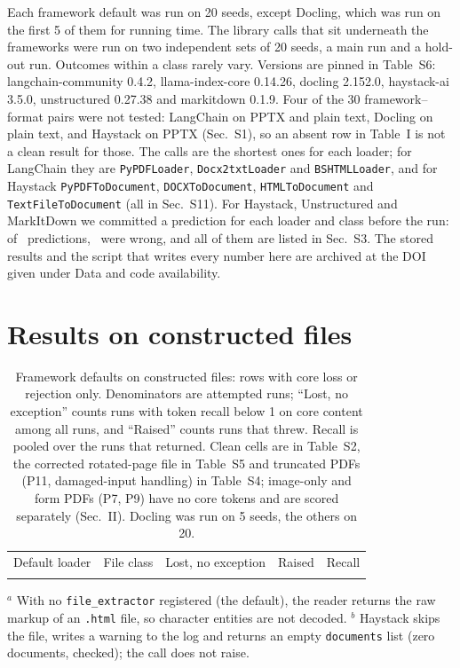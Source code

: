 \documentclass[aps,pre,twocolumn,superscriptaddress,nofootinbib,10pt]{revtex4-2}
\begin{document}
Each framework default was run on 20 seeds, except Docling, which was run on the first 5 of them for running time. The library calls that sit underneath the frameworks were run on two independent sets of 20 seeds, a main run and a hold-out run. Outcomes within a class rarely vary. Versions are pinned in Table~S6: langchain-community 0.4.2, llama-index-core 0.14.26, docling 2.152.0, haystack-ai 3.5.0, unstructured 0.27.38 and markitdown 0.1.9. Four of the 30 framework--format pairs were not tested: LangChain on PPTX and plain text, Docling on plain text, and Haystack on PPTX (Sec.~S1), so an absent row in Table~I is not a clean result for those. The calls are the shortest ones for each loader; for LangChain they are \texttt{PyPDFLoader}, \texttt{Docx2txtLoader} and \texttt{BSHTMLLoader}, and for Haystack \texttt{PyPDFToDocument}, \texttt{DOCXToDocument}, \texttt{HTMLToDocument} and \texttt{TextFileToDocument} (all in Sec.~S11). For Haystack, Unstructured and MarkItDown we committed a prediction for each loader and class before the run: of \preregCells\ predictions, \preregMiss\ were wrong, and all of them are listed in Sec.~S3. The stored results and the script that writes every number here are archived at the DOI given under Data and code availability.

\section{Results on constructed files}

\begin{table}[t]
\caption{Framework defaults on constructed files: rows with core loss or rejection only. Denominators are attempted runs; ``Lost, no exception'' counts runs with token recall below 1 on core content among all runs, and ``Raised'' counts runs that threw. Recall is pooled over the runs that returned. Clean cells are in Table~S2, the corrected rotated-page file in Table~S5 and truncated PDFs (P11, damaged-input handling) in Table~S4; image-only and form PDFs (P7, P9) have no core tokens and are scored separately (Sec.~II). Docling was run on 5 seeds, the others on 20.\label{tab:fw}}
\begin{ruledtabular}
\begin{tabular}{llccc}
Default loader & File class & Lost, no exception & Raised & Recall \\
\colrule

\end{tabular}
\end{ruledtabular}
\raggedright\footnotesize $^{a}$ With no \texttt{file\_extractor} registered (the default), the reader returns the raw markup of an \texttt{.html} file, so character entities are not decoded. $^{b}$ Haystack skips the file, writes a warning to the log and returns an empty \texttt{documents} list (zero documents, checked); the call does not raise.
\end{table}
\end{document}
